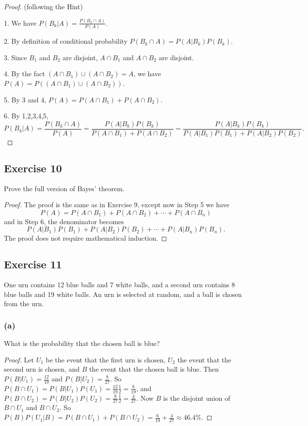 \documentclass[14pt]{extarticle}
\begin{document}
\begin{proof}
(following the Hint) 

1. We have \(P(B_k | A) = \frac{P(B_k \cap A)}{P(A)}\). 

2. By definition of conditional probability \(P(B_k \cap A) = P(A|B_k)P(B_k)\).

3. Since \(B_1\) and \(B_2\) are disjoint, \(A \cap B_1\) and \(A \cap B_2\) are disjoint.

4. By the fact \((A \cap B_1) \cup (A \cap B_2) = A\), we have \(P(A) = P((A \cap B_1) \cup (A \cap B_2))\).

5. By 3 and 4, \(P(A) = P(A \cap B_1) + P(A \cap B_2)\). 

6. By 1,2,3,4,5,
\[
P(B_k | A) = \frac{P(B_k \cap A)}{P(A)} = \frac{P(A|B_k)P(B_k)}{P(A \cap B_1) + P(A \cap B_2)}
= \frac{P(A|B_k)P(B_k)}{P(A|B_1)P(B_1) + P(A|B_2)P(B_2)}.
\]
\end{proof}

\subsection{Exercise 10}
Prove the full version of Bayes’ theorem.
\begin{proof}
The proof is the same as in Exercise 9, except now in Step 5 we have
\[
P(A) = P(A \cap B_1) + P(A \cap B_2) + \cdots + P(A \cap B_n)
\]
and in Step 6, the denominator becomes
\[
P(A|B_1)P(B_1) + P(A|B_2)P(B_2) + \cdots + P(A|B_n)P(B_n).
\]
The proof does not require mathematical induction.
\end{proof}

\subsection{Exercise 11}
One urn contains 12 blue balls and 7 white balls, and a second urn contains 8 blue balls and 19 white balls. An urn is 
selected at random, and a ball is chosen from the urn.

\subsubsection{(a)}
What is the probability that the chosen ball is blue?
\begin{proof}
Let \(U_1\) be the event that the first urn is chosen, \(U_2\) the event that the second urn is chosen, and \(B\) the event 
that the chosen ball is blue. Then \(P(B|U_1) = \frac{12}{19}\) and \(P(B|U_2) = \frac{8}{27}\). So \(P(B \cap U_1) = P(B|
U_1)P(U_1) = \frac{12}{19}\frac{1}{2} = \frac{6}{19}\), and \(P(B \cap U_2) = P(B|U_2)P(U_2) = \frac{8}{27}\frac{1}{2} = 
\frac{4}{27}\). Now \(B\) is the disjoint union of \(B \cap U_1\) and \(B \cap U_2\). So \(P(B)P(U_1|B) = P(B \cap U_1) +
P(B \cap U_2) = \frac{6}{19} + \frac{4}{27} \approx 46.4\%\).
\end{proof}
\end{document}
